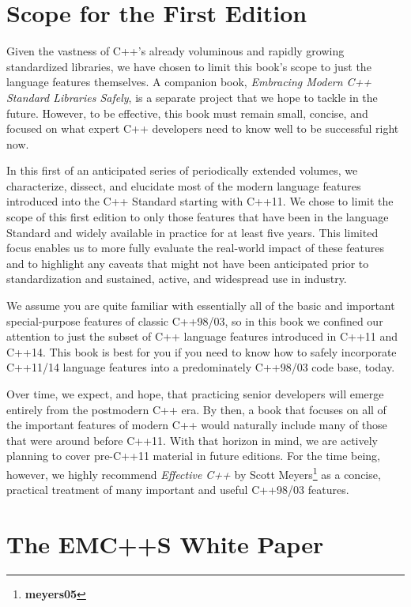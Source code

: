 \section{Scope for the First Edition}

Given the vastness of C++'s already voluminous and rapidly growing standardized libraries, we have chosen to limit this book’s scope to just the language features themselves. A companion book, \textit{Embracing Modern C++ Standard Libraries Safely}, is a separate project that we hope to tackle in the future. However, to be effective, this book must remain small, concise, and focused on what expert C++ developers need to know well to be successful right now.

In this first of an anticipated series of periodically extended volumes, we characterize, dissect, and elucidate most of the modern language features introduced into the C++ Standard starting with C++11. We chose to limit the scope of this first edition to only those features that have been in the language Standard and widely available in practice for at least five years. This limited focus enables us to more fully evaluate the real-world impact of these features and to highlight any caveats that might not have been anticipated prior to standardization and sustained, active, and widespread use in industry.

We assume you are quite familiar with essentially all of the basic and important special-purpose features of classic C++98/03, so in this book we confined our attention to just the subset of C++ language features introduced in C++11 and C++14. This book is best for you if you need to know how to safely incorporate C++11/14 language features into a predominately C++98/03 code base, today.

Over time, we expect, and hope, that practicing senior developers will emerge entirely from the postmodern C++ era. By then, a book that focuses on all of the important features of modern C++ would naturally include many of those that were around before C++11. With that horizon in mind, we are actively planning to cover pre-C++11 material in future editions. For the time being, however, we highly recommend \textit{Effective C++} by Scott Meyers\footnote{\textbf{meyers05}} as a concise, practical treatment of many important and useful C++98/03 features.

\section[The {\sffamily\itshape EMC++S} White Paper]{The {\sfbsectionitalRomeo EMC++S} White Paper}

